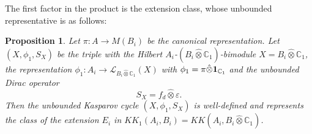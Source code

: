 \documentclass[12pt]{amsart}
\newtheorem{proposition}[theorem]{Proposition}
\newcommand{\CM}{{\mathbb C}}
\newcommand{\Ll}{{\mathcal L}}
\newcommand{\one}{{\bf 1}}
\newcommand{\ep}{\varepsilon}
\begin{document}
The first factor in the product is the extension class, whose unbounded representative is as follows:

\begin{proposition}
\label{prop:ext_class_unbounded}
Let $\pi: A \to M(B_i)$ be the canonical representation.
Let $(X, \phi_1, S_X)$ be the triple with the Hilbert $A_i$-$(B_i \hat{\otimes} \CM_1)$-bimodule $X= B_i \hat{\otimes} \CM_1$, the representation $\phi_1 \colon A_i \to \Ll_{B_i \hat{\otimes} \CM_1}(X)$ with $\phi_1=\pi \hat{\otimes} \one_{\CM_1}$ and the unbounded Dirac operator
$$S_X = f_d \hat{\otimes} \ep.$$
Then the unbounded Kasparov cycle $(X, \phi_1, S_X)$ is well-defined and represents the class of the extension $E_i$ in $KK_1(A_i, B_i)=KK(A_i, B_i \hat{\otimes}\CM_1)$.
\end{proposition}
\end{document}
